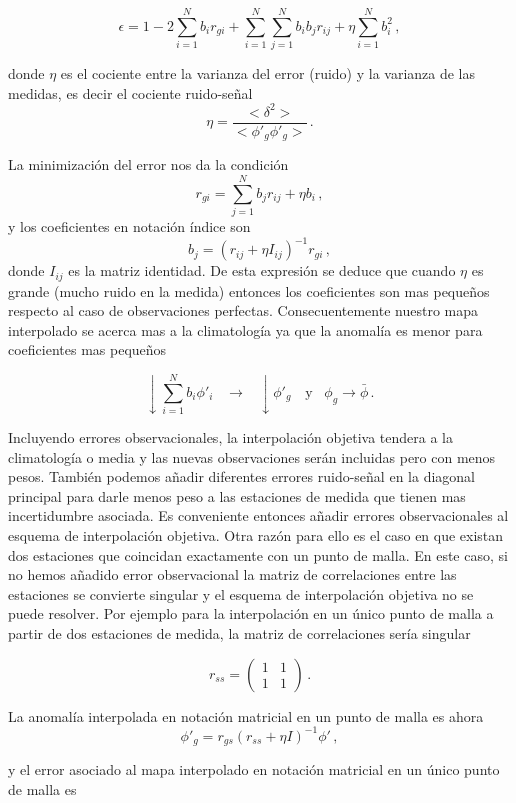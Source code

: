 \documentclass[
]{agujournal2019}
\begin{document}
\[\epsilon=1-2 \sum\limits^N_{i=1} b_i r_{gi} + \sum\limits^N_{i=1}\sum\limits^N_{j=1} b_i b_j r_{ij} + \eta\sum\limits_{i=1}^N b_i^2\,,\]

donde \(\eta\) es el cociente entre la varianza del error (ruido) y la
varianza de las medidas, es decir el cociente ruido-señal
\[\eta=\frac{<\delta^2>}{<\phi'_g\phi'_g>}\,.\]

La minimización del error nos da la condición
\[r_{gi}=\sum\limits^N_{j=1}b_j r_{ij}+\eta b_i\,,\] y los coeficientes
en notación índice son \[b_j=(r_{ij} + \eta I_{ij})^{-1}r_{gi}\,,\]
donde \(I_{ij}\) es la matriz identidad. De esta expresión se deduce que
cuando \(\eta\) es grande (mucho ruido en la medida) entonces los
coeficientes son mas pequeños respecto al caso de observaciones
perfectas. Consecuentemente nuestro mapa interpolado se acerca mas a la
climatología ya que la anomalía es menor para coeficientes mas pequeños

\[\downarrow \sum\limits^N_{i=1}b_i\phi'_i \,\,\,\,\,\rightarrow \,\,\,\,\,\downarrow\phi'_g\,\,\,\,\,\,\text{y}\,\,\,\,\,\phi_g\rightarrow\bar{\phi}\,.\]

Incluyendo errores observacionales, la interpolación objetiva tendera a
la climatología o media y las nuevas observaciones serán incluidas pero
con menos pesos. También podemos añadir diferentes errores ruido-señal
en la diagonal principal para darle menos peso a las estaciones de
medida que tienen mas incertidumbre asociada. Es conveniente entonces
añadir errores observacionales al esquema de interpolación objetiva.
Otra razón para ello es el caso en que existan dos estaciones que
coincidan exactamente con un punto de malla. En este caso, si no hemos
añadido error observacional la matriz de correlaciones entre las
estaciones se convierte singular y el esquema de interpolación objetiva
no se puede resolver. Por ejemplo para la interpolación en un único
punto de malla a partir de dos estaciones de medida, la matriz de
correlaciones sería singular

\[r_{ss}=
       \left(\begin{array}{cc}
  1 & 1 \\
  1 & 1
     \end{array}\right)\,.\]

La anomalía interpolada en notación matricial en un punto de malla es
ahora \[\phi'_g=r_{gs}(r_{ss}+\eta I)^{-1}\phi'\,,\]

y el error asociado al mapa interpolado en notación matricial en un
único punto de malla es
\end{document}
